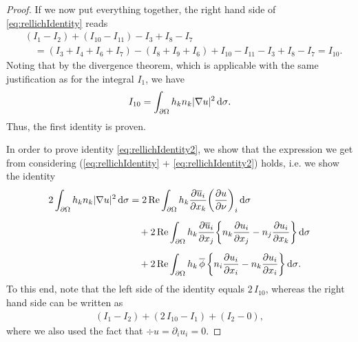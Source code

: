 \begin{proof}
  If we now put everything together, the right hand side of \eqref{eq:rellichIdentity} reads
  \begin{align*}
    &(I_1 - I_2) + (I_{10} - I_{11}) - I_3 + I_8 - I_7 \\
    &\quad= (I_3 + I_4 + I_6 + I_7) - (I_8 + I_9 + I_6) + I_{10} - I_{11} - I_3 + I_8 - I_7 = I_{10}.
  \end{align*}
  Noting that by the divergence theorem, which is applicable with the same justification as for the integral $I_1$, we have
  \begin{align*}
    I_{10} = \int_{\partial\Omega} h_k n_k |\nabla u|^2 \, {\operatorname{d}\!{\sigma}}.
  \end{align*}
  Thus, the first identity is proven.

  In order to prove identity \eqref{eq:rellichIdentity2}, we show that the expression we get from considering (\eqref{eq:rellichIdentity} + \eqref{eq:rellichIdentity2}) holds, i.e. we show the identity
  \begin{align*}
    2 \int_{\partial\Omega} h_k n_k |\nabla u|^2 \, {\operatorname{d}\!{\sigma}}
    &= 2 \operatorname{Re} \int_{\partial\Omega} h_k \frac{\partial \overline u_i}{\partial x_k} \bigg( \frac{\partial u}{\partial \nu} \bigg)_i \, {\operatorname{d}\!{\sigma}} \\[0.5em]
    &\quad + 2 \operatorname{Re} \int_{\partial\Omega} h_k \frac{\partial\overline u_i}{\partial x_j} \bigg\{ n_k \frac{\partial u_i}{\partial x_j} - n_j \frac{\partial u_i}{\partial x_k} \bigg\} \, {\operatorname{d}\!{\sigma}} \\[0.5em]
    &\quad+ 2 \operatorname{Re} \int_{\partial\Omega} h_k \, \overline \phi\,  \bigg\{ n_i \frac{\partial u_i}{\partial x_i} - n_k \frac{\partial u_i}{\partial x_i} \bigg\} \, {\operatorname{d}\!{\sigma}}.
  \end{align*}
  To this end, note that the left side of the identity equals $2\, I_{10}$, whereas the right hand side can be written as 
  \begin{align*}
    (I_1 - I_2) + ( 2 \, I_{10} - I_1) + (I_2 - 0),
  \end{align*}
  where we also used the fact that $\div u = \partial_i u_i = 0$.
\end{proof}

